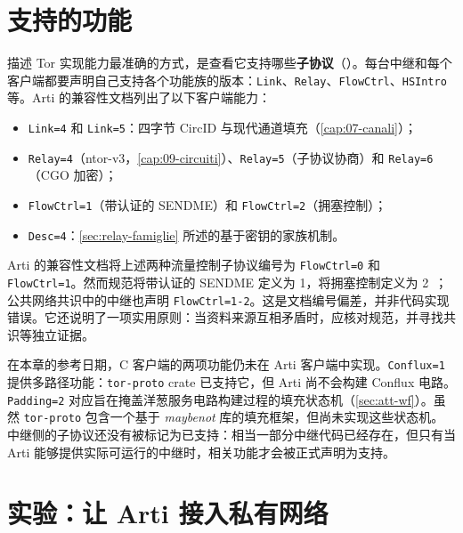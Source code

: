 \section{支持的功能}\label{sec:arti-supporto}

描述 Tor 实现能力最准确的方式，是查看它支持哪些\textbf{子协议}（）。每台中继和每个客户端都要声明自己支持各个功能族的版本：\texttt{Link}、\texttt{Relay}、\texttt{FlowCtrl}、\texttt{HSIntro} 等。Arti 的兼容性文档列出了以下客户端能力：
\begin{itemize}
  \item \texttt{Link=4} 和 \texttt{Link=5}：四字节 CircID 与现代通道填充（\cref{cap:07-canali}）；
  \item \texttt{Relay=4}（ntor-v3，\cref{cap:09-circuiti}）、\texttt{Relay=5}（子协议协商）和 \texttt{Relay=6}（CGO 加密）；
  \item \texttt{FlowCtrl=1}（带认证的 SENDME）和 \texttt{FlowCtrl=2}（拥塞控制）；
  \item \texttt{Desc=4}：\cref{sec:relay-famiglie} 所述的基于密钥的家族机制。
\end{itemize}

\begin{attenzione}
Arti 的兼容性文档将上述两种流量控制子协议编号为 \texttt{FlowCtrl=0} 和 \texttt{FlowCtrl=1}。然而规范将带认证的 SENDME 定义为 1，将拥塞控制定义为 2~；公共网络共识中的中继也声明 \texttt{FlowCtrl=1-2}。这是文档编号偏差，并非代码实现错误。它还说明了一项实用原则：当资料来源互相矛盾时，应核对规范，并寻找共识等独立证据。
\end{attenzione}

在本章的参考日期，C 客户端的两项功能仍未在 Arti 客户端中实现。\texttt{Conflux=1} 提供多路径功能：\texttt{tor-proto} crate 已支持它，但 Arti 尚不会构建 Conflux 电路。\texttt{Padding=2} 对应旨在掩盖洋葱服务电路构建过程的填充状态机（\cref{sec:att-wf}）。虽然 \texttt{tor-proto} 包含一个基于 \emph{maybenot} 库的填充框架，但尚未实现这些状态机。中继侧的子协议还没有被标记为已支持：相当一部分中继代码已经存在，但只有当 Arti 能够提供实际可运行的中继时，相关功能才会被正式声明为支持。

\section{实验：让 Arti 接入私有网络}\label{sec:lab-arti}

